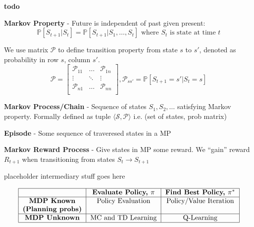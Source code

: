 \documentclass[a4paper,10pt,twocolumn]{article}
\begin{document}
\begin{tcolorbox}[title={Decision Trees and Neural Networks}, module]
    \textbf{todo}
\end{tcolorbox}

\begin{tcolorbox}[title={Reinforcement Learning}, module]
    \textbf{Markov Property} - Future is independent of past given present:
    \[
        \mathbb{P}[S_{t + 1} | S_t] = \mathbb{P}[S_{t + 1} | S_1, \ldots, S_t] \text{ where } S_t \text{ is state at time } t
    \]

    We use matrix $\mathcal{P}$ to define transition property from state $s$ to $s'$, denoted as probability in row $s$, column $s'$.
    \[
        \mathcal{P} =
        \begin{bmatrix}
            \mathcal{P}_{11} & \ldots & \mathcal{P}_{1n} \\
            \vdots & \ddots & \vdots \\
            \mathcal{P}_{n1} & \ldots & \mathcal{P}_{nn} \\
        \end{bmatrix}
        , \mathcal{P}_{ss'} = \mathbb{P}[S_{t+1} = s' | S_t = s]
    \]

    \textbf{Markov Process/Chain} - Sequence of states $S_1, S_2, \ldots$ satisfying Markov property. Formally defined as tuple $\langle \mathcal{S}, \mathcal{P} \rangle$ i.e. (set of states, prob matrix)

    \textbf{Episode} - Some sequence of traveresed states in a MP

    \textbf{Markov Reward Process} - Give states in MP some reward. We ``gain'' reward $R_{t + 1}$ when transitioning from states $S_t \to S_{t + 1}$

    placeholder intermediary stuff goes here

    \[
        \begin{tabular}{|c|c|c|}
            \hline
            & \textbf{Evaluate Policy, $\pi$} & \textbf{Find Best Policy, $\pi^*$} \\
            \hline
            \textbf{MDP Known} & Policy Evaluation & Policy/Value Iteration \\
            \textbf{(Planning probs)} && \\
            \hline
            \textbf{MDP Unknown} & MC and TD Learning & Q-Learning \\
            \hline
        \end{tabular}
    \]

\end{tcolorbox}
\end{document}
